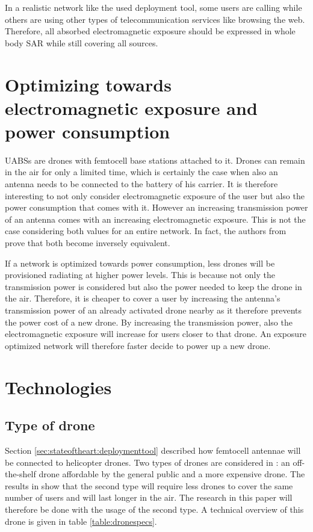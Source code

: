 In a realistic network like the used deployment tool, some users are calling while others are using other types of telecommunication services like browsing the web.
Therefore, all absorbed electromagnetic exposure should be expressed in whole body SAR while still covering all sources.

\section{Optimizing towards electromagnetic exposure and power consumption}
\gls{UABS}s are drones with femtocell base stations attached to it. Drones can remain in the air for only a limited time, which is certainly 
the case when also an antenna needs to be connected to the battery of his carrier. It is therefore
interesting to not only consider electromagnetic exposure of the user but also the power consumption that comes with it. 
However an increasing transmission power of an antenna comes with an increasing electromagnetic exposure. This is not the case considering
both values for an entire network. In fact, the authors from \cite{J1}  prove that both become inversely equivalent.

If a network is optimized towards power consumption, less drones will be provisioned radiating at higher power levels. This is because not only 
the transmission power is considered but also the power needed to keep the drone in the air. Therefore, it is cheaper to cover a user by 
increasing the antenna's transmission power of an already activated drone nearby as it therefore prevents the power cost of a new drone.
By increasing the transmission power, also the electromagnetic exposure will increase for users closer to that drone. An exposure optimized
network will therefore faster decide to power up a new drone.

\section{Technologies}
\subsection{Type of drone}

Section \ref{sec:stateoftheart:deploymenttool} described how femtocell antennae will be connected to helicopter drones. Two types of 
drones are considered in \cite{J2}: an off-the-shelf drone affordable by the general public and a more expensive drone. The results in \cite{J2}
show that the second type will require less drones to cover the same number of users and will last longer in the air. The research in this paper
will therefore be done with the usage of the second type. A technical overview of this drone is given in table \ref{table:dronespecs}.

